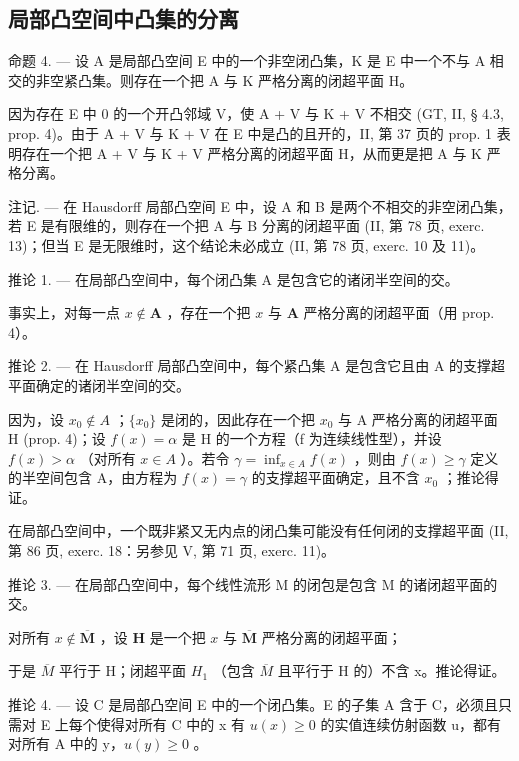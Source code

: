 \subsection{局部凸空间中凸集的分离}

命题 4. --- 设 A 是局部凸空间 E 中的一个非空闭凸集，K 是 E 中一个不与 A 相交的非空紧凸集。则存在一个把 A 与 K 严格分离的闭超平面 H。

因为存在 E 中 0 的一个开凸邻域 V，使 A + V 与 K + V 不相交 (GT, II, § 4.3, prop. 4)。由于 A + V 与 K + V 在 E 中是凸的且开的，II, 第 37 页的 prop. 1 表明存在一个把 A + V 与 K + V 严格分离的闭超平面 H，从而更是把 A 与 K 严格分离。

注记. --- 在 Hausdorff 局部凸空间 E 中，设 A 和 B 是两个不相交的非空闭凸集，若 E 是有限维的，则存在一个把 A 与 B 分离的闭超平面 (II, 第 78 页, exerc. 13)；但当 E 是无限维时，这个结论未必成立 (II, 第 78 页, exerc. 10 及 11)。

推论 1. --- 在局部凸空间中，每个闭凸集 A 是包含它的诸闭半空间的交。

事实上，对每一点 \(x \notin \mathbf{A}\) ，存在一个把 \(x\) 与 \(\mathbf{A}\) 严格分离的闭超平面（用 prop. 4）。

推论 2. --- 在 Hausdorff 局部凸空间中，每个紧凸集 A 是包含它且由 A 的支撑超平面确定的诸闭半空间的交。

因为，设 \(x_{0} \notin A\) ；\(\{x_{0}\}\) 是闭的，因此存在一个把 \(x_{0}\) 与 A 严格分离的闭超平面 H (prop. 4)；设 \(f(x) = \alpha\) 是 H 的一个方程（f 为连续线性型），并设 \(f(x) > \alpha\) （对所有 \(x \in A\) ）。若令 \(\gamma = \inf_{x \in A} f(x)\) ，则由 \(f(x) \geqslant \gamma\) 定义的半空间包含 A，由方程为 \(f(x) = \gamma\) 的支撑超平面确定，且不含 \(x_{0}\) ；推论得证。

在局部凸空间中，一个既非紧又无内点的闭凸集可能没有任何闭的支撑超平面 (II, 第 86 页, exerc. 18：另参见 V, 第 71 页, exerc. 11)。

推论 3. --- 在局部凸空间中，每个线性流形 M 的闭包是包含 M 的诸闭超平面的交。

对所有 \(x \notin \overline{\mathbf{M}}\) ，设 \(\mathbf{H}\) 是一个把 \(x\) 与 \(\overline{\mathbf{M}}\) 严格分离的闭超平面；

于是 \(\overline{M}\) 平行于 H；闭超平面 \(H_{1}\) （包含 \(\overline{M}\) 且平行于 H 的）不含 x。推论得证。

推论 4. --- 设 C 是局部凸空间 E 中的一个闭凸集。E 的子集 A 含于 C，必须且只需对 E 上每个使得对所有 C 中的 x 有 \(u(x) \geqslant 0\) 的实值连续仿射函数 u，都有对所有 A 中的 y，\(u(y) \geqslant 0\) 。

